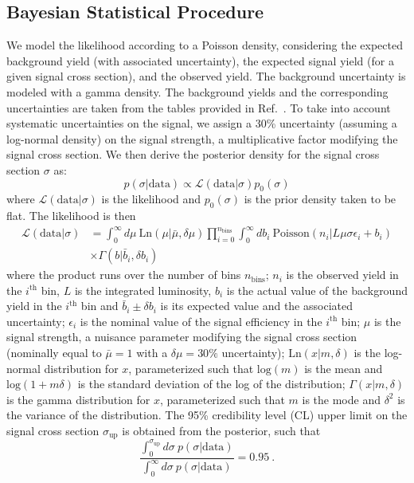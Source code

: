 \subsection{Bayesian Statistical Procedure}
We model the likelihood according to a Poisson density,
considering the expected background yield (with associated
uncertainty), the expected signal yield (for a given signal cross
section), and the observed yield. The background uncertainty is modeled with a gamma density. The
background yields and the corresponding uncertainties are taken from the tables provided
in Ref.~\cite{RazorHgaga}. To take into account systematic
uncertainties on the signal, we assign a 30\% uncertainty (assuming a
log-normal density) on the signal strength, a multiplicative
factor modifying the signal cross section. We then derive the
posterior density for the signal cross section $\sigma$ as:
\begin{equation}
p(\sigma|\mathrm{data}) \propto \mathcal L(\mathrm{data} |\sigma)p_0(\sigma)
\label{eqn:posterior}
\end{equation}
where $\mathcal L(\mathrm{data} |\sigma)$ is the likelihood and $p_0(\sigma)$ is the prior density taken to be
flat. The likelihood is then
\begin{align}
\mathcal L(\mathrm{data} |\sigma) &=\int_{0}^{\infty}d\mu~\mathrm{Ln}(\mu|\bar\mu,\delta\mu)\prod_{i=0}^{n_{\mathrm{bins}}}\int_0^{\infty} db_i~
   \mathrm{Poisson}(n_i|L\mu\sigma\epsilon_i+ b_i)\nonumber\\
&\times\Gamma(b|\bar{b}_i,\delta b_i)
\label{eqn:likelihood}
\end{align}
where the product runs over the number of bins $n_{\mathrm{bins}}$; $n_i$ is the
observed yield in the $i^{\mathrm{th}}$ bin, $L$ is the integrated
luminosity, $b_i$ is the actual value of the background yield in the
$i^{\mathrm{th}}$ bin and $\bar{b}_i\pm \delta b_i$ is its expected value
and the associated uncertainty; $\epsilon_i$ is the nominal value
of the signal efficiency in the $i^{\mathrm{th}}$ bin; $\mu$ is the
signal strength, a nuisance parameter modifying the signal cross section
(nominally equal to $\bar\mu=1$ with a $\delta\mu=30\%$ uncertainty);
$\mathrm{Ln}(x|m,\delta)$ is the log-normal
distribution for $x$, parameterized such that $\mathrm{log}(m)$ is the
mean and $\mathrm{log}(1+m\delta)$ is the standard deviation of the
log of the distribution; $\Gamma(x|m,\delta)$ is the gamma
distribution for $x$, parameterized such that $m$ is the
mode and $\delta^2$ is the variance of the distribution. The 95\%
credibility level (CL) upper limit on the
signal cross section $\sigma_{\mathrm{up}}$ is obtained from the
posterior, such that 
\begin{equation}
\frac{\int_0^{\sigma_{\mathrm{up}}}d\sigma~ p(\sigma|\mathrm{data})}{\int_0^{\infty}d\sigma~ p(\sigma|\mathrm{data})} = 0.95~.
\end{equation}

